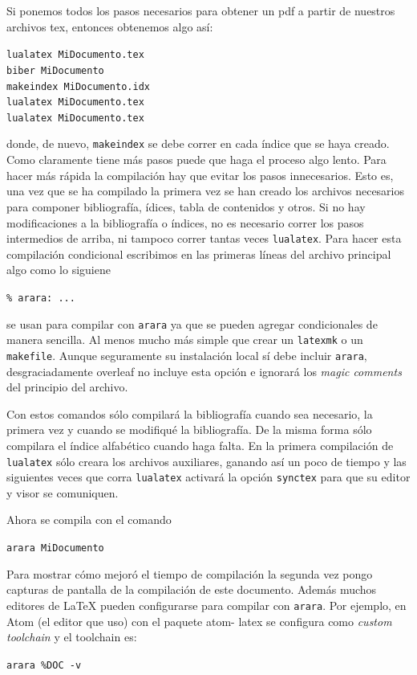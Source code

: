 Si ponemos todos los pasos necesarios para obtener un pdf a partir de nuestros archivos tex, entonces obtenemos algo así:
\begin{flushleft}
  \verb|lualatex MiDocumento.tex|\\
  \verb|biber MiDocumento|\\
  \verb|makeindex MiDocumento.idx|\\
  \verb|lualatex MiDocumento.tex|\\
  \verb|lualatex MiDocumento.tex|
\end{flushleft}
donde, de nuevo, \texttt{makeindex} se debe correr en cada índice que se haya
creado. Como claramente tiene más pasos puede que haga el proceso algo lento.
Para hacer más rápida la compilación hay que evitar los pasos innecesarios.
Esto es, una vez que se ha compilado la primera vez se han creado los
archivos necesarios para componer bibliografía, ídices, tabla de contenidos y
otros. Si no hay modificaciones a la bibliografía o índices, no es necesario
correr los pasos intermedios de arriba, ni tampoco correr tantas veces
\texttt{lualatex}. Para hacer esta compilación condicional escribimos
en las primeras líneas del archivo principal algo como lo siguiene
\begin{flushleft}
  \verb|% arara: ...|
\end{flushleft}
se usan para compilar con \texttt{arara} ya que se pueden agregar
condicionales de manera sencilla. Al menos mucho más simple que crear un
\texttt{latexmk} o un \texttt{makefile}. Aunque seguramente su instalación
local sí debe incluir \texttt{arara}, desgraciadamente overleaf no incluye
esta opción e ignorará los \textit{magic comments} del principio del archivo.

Con estos comandos sólo compilará la bibliografía cuando sea necesario, la
primera vez y cuando se modifiqué la bibliografía. De la misma forma sólo
compilara el índice alfabético cuando haga falta. En la primera compilación
de \texttt{lualatex} sólo creara los archivos auxiliares, ganando así un
poco de tiempo y las siguientes veces que corra \texttt{lualatex} activará
la opción \texttt{synctex} para que su editor y visor se comuniquen.

Ahora se compila con el comando
\begin{flushleft}
  \verb|arara MiDocumento|
\end{flushleft}
Para mostrar cómo mejoró el tiempo de compilación la segunda
vez pongo capturas de pantalla de la compilación de este documento.
Además muchos editores de \LaTeX{} pueden configurarse para compilar con
\texttt{arara}.  Por ejemplo, en Atom (el editor que uso) con el paquete atom-
latex se configura como \textit{custom toolchain} y el toolchain es:
\begin{flushleft}
  \verb|arara %DOC -v|
\end{flushleft}

